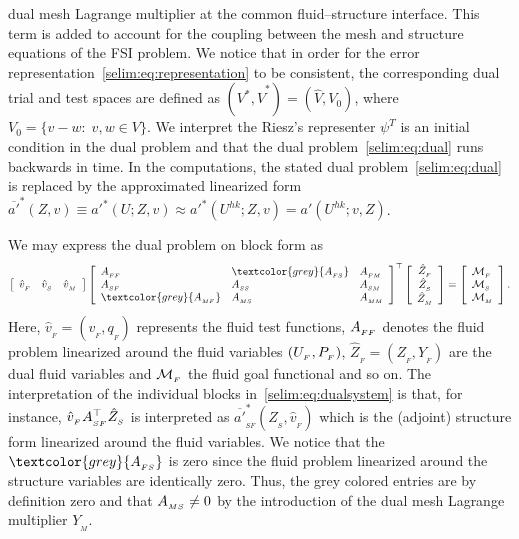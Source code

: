 dual mesh Lagrange multiplier at the common fluid--structure
interface.  This term is added to account for the coupling between the
mesh and structure equations of the FSI problem.  We notice that in
order for the error representation~\eqref{selim:eq:representation} to
be consistent, the corresponding dual trial and test spaces are
defined as $(V^*,
\hat{V}^*)=(\hat{V}, V_0)$, where  $V_0 = \{v-w:\;v,w\in V
\}$. We interpret the Riesz's representer $\psi^T$ is an initial condition in
the dual problem and that the dual problem~\eqref{selim:eq:dual} runs
backwards in time. In the computations, the stated dual
problem~\eqref{selim:eq:dual} is replaced by the approximated
linearized form $\overline{a'}^{*}(Z, v) \equiv a'^{*}(U; Z, v)
\approx a'^{*}(U^{hk}; Z, v)  = a'(U^{hk}; v, Z)$.


We may express the dual problem on block form as
\begin{eqnarray}
\label{selim:eq:dualsystem}
\left[\begin{array}{ccc} \hat{v}_{_{F}} & \hat{v}_{_{S}} & \hat{v}_{_{M}}
  \end{array} \right]
\left[\begin{array}{lll} \AFF & \textcolor{grey}{\AFS} & \AFM
    \\ \ASF & \ASS & \ASM \\ \textcolor{grey}{\AMF} & \AMS &
    \AMM
\end{array} \right]^{\top}
\left[ \begin{array}{c} \hat{Z}_{_{F}} \\ \hat{Z}_{_{S}}
    \\ \hat{Z}_{_{M}} \end{array} \right] =\left[ \begin{array}{l}
    \M_{_{F}}\\ \M_{{_S}}\\ \M_{_{M}} \end{array} \right].
\end{eqnarray}
Here, $\hat{v}_{_{F}} = (v_{_{F}}, q_{_{F}})$ represents the fluid
test functions, $A_{_{FF}}$ denotes the fluid problem linearized around the
fluid variables $(U_{_{F}},P_{_{F}})$, $\hat{Z}_{_{F}} = (Z_{_{F}}, Y_{_{F}})$
are the dual fluid variables and $\mathcal{M}_{_{F}}$ the fluid goal functional
and so on. The interpretation of the individual blocks
in~\eqref{selim:eq:dualsystem} is that, for instance,
$\hat{v}_{_{F}}A_{_{SF}}^{\top}\hat{Z}_{_{S}} $ is interpreted as
$\overline{a'}^*_{_{SF}}(\hat{Z}_{_{S}}, \hat{v}_{_{F}})$ which is the
(adjoint) structure form linearized around the fluid variables.  We
notice that the $\textcolor{grey}{\AFS}$ is zero since the fluid
problem linearized around the structure variables are identically
zero. Thus, the grey colored entries are by definition zero and that
$A_{_{MS}} \neq 0$ by the introduction of the dual mesh Lagrange multiplier
$Y_{_{M}}$.

